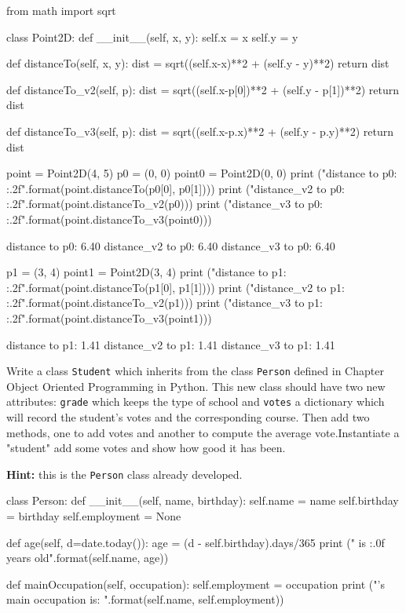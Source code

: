 \cprotEnv\begin{solution}
\begin{ipython}
from math import sqrt

class Point2D:
    def __init__(self, x, y):
        self.x = x
        self.y = y

    def distanceTo(self, x, y):
        dist = sqrt((self.x-x)**2 + (self.y - y)**2)
        return dist

    def distanceTo_v2(self, p):
        dist = sqrt((self.x-p[0])**2 + (self.y - p[1])**2)
        return dist

    def distanceTo_v3(self, p):
        dist = sqrt((self.x-p.x)**2 + (self.y - p.y)**2)
        return dist

point = Point2D(4, 5)
p0 = (0, 0)
point0 = Point2D(0, 0)
print ("distance to p0: {:.2f}".format(point.distanceTo(p0[0], p0[1])))
print ("distance_v2 to p0: {:.2f}".format(point.distanceTo_v2(p0)))
print ("distance_v3 to p0: {:.2f}".format(point.distanceTo_v3(point0)))
\end{ipython}
\begin{ioutput}
distance to p0: 6.40
distance\_v2 to p0: 6.40
distance\_v3 to p0: 6.40
\end{ioutput}
\begin{ipython}
p1 = (3, 4)
point1 = Point2D(3, 4)
print ("distance to p1: {:.2f}".format(point.distanceTo(p1[0], p1[1])))
print ("distance_v2 to p1: {:.2f}".format(point.distanceTo_v2(p1)))
print ("distance_v3 to p1: {:.2f}".format(point.distanceTo_v3(point1)))
\end{ipython}
\begin{ioutput}
distance to p1: 1.41
distance\_v2 to p1: 1.41
distance\_v3 to p1: 1.41
\end{ioutput}
\end{solution}

\cprotEnv\begin{question}
Write a class \texttt{Student} which inherits from the class \texttt{Person} defined in Chapter Object Oriented Programming in Python. This new class should have two new attributes: \texttt{grade} which keeps the type of school and \texttt{votes} a dictionary which will record the student's votes and the corresponding course. Then add two methods, one to add votes and another to compute the average vote.Instantiate a "student" add some votes and show how good it has been.

\noindent\textbf{Hint:} this is the \texttt{Person} class already developed.

\begin{ipython}
class Person:
    def __init__(self, name, birthday):
        self.name = name
        self.birthday = birthday
        self.employment = None

    def age(self, d=date.today()):
        age = (d - self.birthday).days/365
        print ("{} is {:.0f} years old".format(self.name, age))

    def mainOccupation(self, occupation):
        self.employment = occupation
        print ("{}'s main occupation is: {}".format(self.name, self.employment))
\end{ipython}
\end{question}

